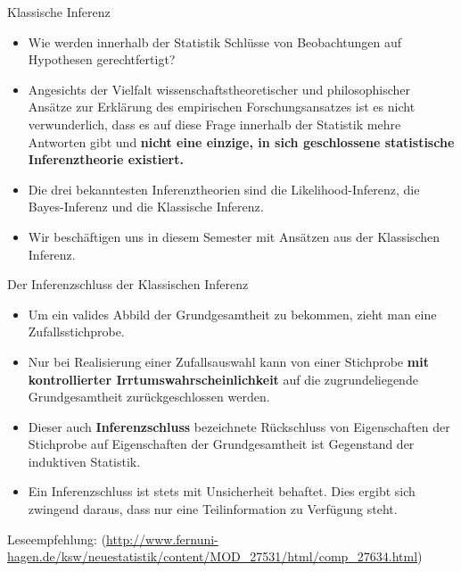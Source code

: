 \documentclass[usenames,dvipsnames,handout]{beamer}
\begin{document}
\begin{frame}{Klassische Inferenz}
\begin{itemize}
\item{Wie werden innerhalb der Statistik Schlüsse von Beobachtungen auf Hypothesen gerechtfertigt?}\pause
\item{Angesichts der Vielfalt wissenschaftstheoretischer und philosophischer Ansätze zur Erklärung des empirischen Forschungsansatzes
ist es nicht verwunderlich, dass es auf diese Frage innerhalb der Statistik mehre Antworten gibt und 
\textbf{nicht eine einzige, in sich geschlossene statistische Inferenztheorie
existiert. }}\pause%
\item{Die drei bekanntesten Inferenztheorien sind die Likelihood-Inferenz, die Bayes-Inferenz und die Klassische Inferenz.}
\item{Wir beschäftigen uns in diesem Semester mit Ansätzen aus der Klassischen Inferenz.}
\end{itemize}
\end{frame}
\begin{frame}{Der Inferenzschluss der Klassischen Inferenz}
\begin{itemize}
\item{Um ein valides  Abbild der Grundgesamtheit zu bekommen,
zieht man eine Zufallsstichprobe.}\pause
\item{Nur bei Realisierung einer Zufallsauswahl kann von einer Stichprobe
\textbf{mit kontrollierter Irrtumswahrscheinlichkeit} auf die zugrundeliegende
Grundgesamtheit zurückgeschlossen werden. }\pause
\item{Dieser auch \textbf{Inferenzschluss} bezeichnete Rückschluss
von Eigenschaften der Stichprobe auf Eigenschaften der Grundgesamtheit ist
Gegenstand der induktiven Statistik.}\pause
\item{Ein Inferenzschluss ist stets mit Unsicherheit behaftet. Dies ergibt sich
zwingend daraus, dass nur eine Teilinformation zu Verfügung steht.}\pause
\end{itemize}
Leseempfehlung:
(\url{http://www.fernuni-hagen.de/ksw/neuestatistik/content/MOD_27531/html/comp_27634.html})
\end{frame}
\end{document}
